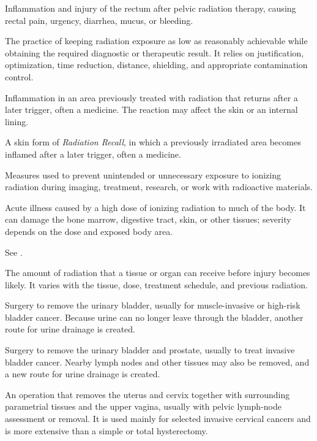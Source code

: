  Inflammation and injury of the rectum after pelvic radiation therapy, causing rectal pain, urgency, diarrhea, mucus, or bleeding.

 The practice of keeping radiation exposure as low as reasonably achievable while
obtaining the required diagnostic or therapeutic result. It relies on justification,
optimization, time reduction, distance, shielding, and appropriate contamination
control.

 Inflammation in an area previously treated with radiation that returns after a later trigger, often a medicine. The reaction may affect the skin or an internal lining.

 A skin form of \textit{Radiation Recall}, in which a previously irradiated area becomes inflamed after a later trigger, often a medicine.

 Measures used to prevent unintended or unnecessary exposure to ionizing radiation during imaging, treatment, research, or work with radioactive materials.

 Acute illness caused by a high dose of ionizing radiation to much of the body. It can damage the bone marrow, digestive tract, skin, or other tissues; severity depends on the dose and exposed body area.

 See .

 The amount of radiation that a tissue or organ can receive before injury becomes likely. It varies with the tissue, dose, treatment schedule, and previous radiation.

 Surgery to remove the urinary bladder, usually for muscle-invasive or high-risk bladder cancer. Because urine can no longer leave through the bladder, another route for urine drainage is created.

 Surgery to remove the urinary bladder and prostate, usually to treat invasive bladder cancer. Nearby lymph nodes and other tissues may also be removed, and a new route for urine drainage is created.

 An operation that removes the uterus and cervix together with surrounding parametrial tissues and the upper vagina, usually with pelvic lymph-node assessment or removal. It is used mainly for selected invasive cervical cancers and is more extensive than a simple or total hysterectomy.

